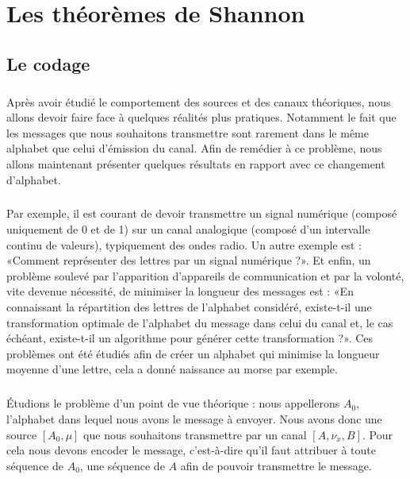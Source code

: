 \chapter{Les théorèmes de Shannon}

\section{Le codage}
	\paragraph{}
	Après avoir étudié le comportement des sources et des canaux théoriques, nous
	allons devoir faire face à quelques réalités plus pratiques. Notamment le fait
	que les messages que nous souhaitons transmettre sont rarement dans le 
	même alphabet que celui d'émission du canal. Afin de remédier à ce problème,
	nous allons maintenant présenter quelques résultats en rapport avec ce 
	changement d'alphabet. 
	
	\paragraph{}
	Par exemple, il est courant de devoir transmettre un signal numérique
	(composé uniquement de 0 et de 1) sur un canal analogique (composé 
	d'un intervalle continu de valeurs), typiquement des ondes radio.
	Un autre exemple est : «Comment représenter des 
	lettres par un signal numérique ?». Et enfin, un problème soulevé par 
	l'apparition d'appareils de communication et par la volonté, vite devenue nécessité, 
	de minimiser la longueur des messages est :
	«En connaissant la répartition des lettres de l'alphabet considéré,
	existe-t-il une transformation optimale de l'alphabet du message
	dans celui du canal et, le cas échéant, existe-t-il un algorithme pour générer cette transformation ?».
	Ces problèmes ont été étudiés afin de créer un alphabet qui minimise la longueur moyenne
	d'une lettre, cela a donné naissance au morse par exemple. 
	
	\paragraph{}
	Étudions le problème d'un point de vue théorique :
	nous appellerons $A_0$, l'alphabet dans lequel nous avons le message à envoyer. Nous avons donc une source 
	$[A_0,\mu]$ que nous souhaitons transmettre par un canal $[A,\nu_x,B]$. Pour cela nous devons encoder
	le message, c'est-à-dire qu'il faut attribuer à toute séquence de $A_0$, une séquence de $A$ afin de 
	pouvoir transmettre le message.

